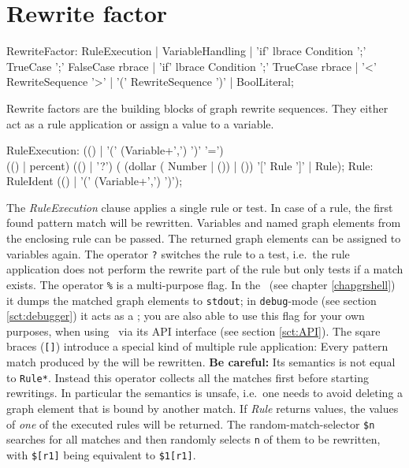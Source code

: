 \section{Rewrite factor}

\begin{rail} 
  RewriteFactor: 
    RuleExecution |
    VariableHandling |
	'if' lbrace Condition ';' TrueCase ';' FalseCase rbrace |
	'if' lbrace Condition ';' TrueCase rbrace |
    '<' RewriteSequence '>' | 
    '(' RewriteSequence ')' |
    BoolLiteral;
\end{rail}\indexmain{\texttt{<>}}
Rewrite factors are the building blocks of graph rewrite sequences.
They either act as a rule application or assign a value to a variable.

\begin{rail}    
  RuleExecution: (() | '(' (Variable+',') ')' '=') \\ (() | percent) (() | '?') ( (dollar ( Number | ()) | ()) '[' Rule ']' | Rule);   
  Rule: RuleIdent (() | '(' (Variable+',') ')');
\end{rail}  
The \emph{RuleExecution} clause applies a single rule or test.
In case of a rule, the first found pattern match will be rewritten.
Variables and named graph elements from the enclosing rule can be passed.
The returned graph elements can be assigned to variables again.
The operator \texttt{?} switches the rule to a test, i.e.\ the rule application does not perform the rewrite part of the rule but only tests if a match exists.
The operator \texttt{\%} is a multi-purpose flag. In the \GrShell\ (see chapter \ref{chapgrshell}) it dumps the matched graph elements to \texttt{stdout}; in \texttt{debug}-mode (see section \ref{sct:debugger}) it acts as a ; you are also able to use this flag for your own purposes, when using \GrG\ via its API interface (see section \ref{sct:API}).
The sqare braces (\texttt{[]}) introduce a special kind of multiple rule application: Every pattern match produced by the will be rewritten. \textbf{Be careful:} Its semantics is not equal to \texttt{Rule*}. Instead this operator collects all the matches first before starting rewritings. In particular the semantics is unsafe, i.e.\ one needs to avoid deleting a graph element that is bound by another match. If \emph{Rule} returns values, the values of \emph{one} of the executed rules will be returned.
The random-match-selector \texttt{\$n} searches for all matches and then randomly selects \texttt{n} of them to be rewritten, with \texttt{\$[r1]} being equivalent to \texttt{\$1[r1]}.

